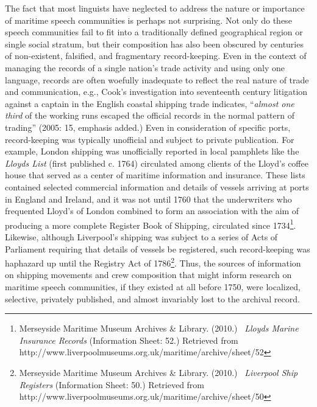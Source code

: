 \documentclass[12pt]{article}
\newenvironment{styleStandard}{\renewcommand\baselinestretch{1.0}\setlength\leftskip{0cm}\setlength\rightskip{0cm plus 1fil}\setlength\parindent{0cm}\setlength\parfillskip{0pt plus 1fil}\setlength\parskip{0in plus 1pt}\writerlistparindent\writerlistleftskip\leavevmode\normalfont\normalsize\writerlistlabel\ignorespaces}{\unskip\vspace{0in plus 1pt}\par}
\newcommand\writerlistleftskip{}
\newcommand\writerlistparindent{}
\newcommand\writerlistlabel{}
\begin{document}
\begin{styleStandard}
The fact that most linguists have neglected to address the nature or importance of maritime speech communities is perhaps not surprising. Not only do these speech communities fail to fit into a traditionally defined geographical region or single social stratum, but their composition has also been obscured by centuries of non-existent, falsified, and fragmentary record-keeping. Even in the context of managing the records of a single nation’s trade activity and using only one language, records are often woefully inadequate to reflect the real nature of trade and communication, e.g., Cook’s investigation into seventeenth century litigation against a captain in the English coastal shipping trade indicates, “\textit{almost one third} of the working runs escaped the official records in the normal pattern of trading” (2005: 15, emphasis added.) Even in consideration of specific ports, record-keeping was typically unofficial and subject to private publication. For example, London shipping was unofficially reported in local pamphlets like the \textit{Lloyd{\textquotesingle}s List }(first published c. 1764) circulated among clients of the Lloyd’s coffee house that served as a center of maritime information and insurance. These lists contained selected commercial information and details of vessels arriving at ports in England and Ireland, and it was not until 1760 that the underwriters who frequented Lloyd’s of London combined to form an association with the aim of producing a more complete Register Book of Shipping, circulated since 1734\footnote{ Merseyside Maritime Museum Archives \& Library. (2010.) \ \textit{Lloyds Marine Insurance Records} (Information Sheet: 52.) Retrieved from http://www.liverpoolmuseums.org.uk/maritime/archive/sheet/52}. Likewise, although Liverpool’s shipping was subject to a series of Acts of Parliament requiring that details of vessels be registered, such record-keeping was haphazard up until the Registry Act of 1786\footnote{ Merseyside Maritime Museum Archives \& Library. (2010.) \ \textit{Liverpool Ship Registers} (Information Sheet: 50.) Retrieved from http://www.liverpoolmuseums.org.uk/maritime/archive/sheet/50}. Thus, the sources of information on shipping movements and crew composition that might inform research on maritime speech communities, if they existed at all before 1750, were localized, selective, privately published, and almost invariably lost to the archival record. 
\end{styleStandard}
\end{document}
